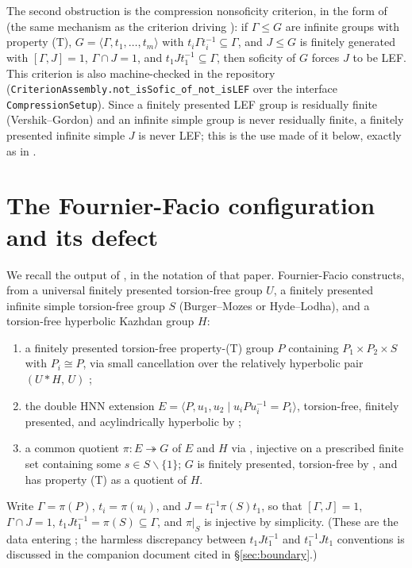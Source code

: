 \documentclass[11pt]{amsart}
\theoremstyle{remark}
\theoremstyle{definition}
\begin{document}
The second obstruction is the compression nonsoficity criterion, in the form
of \cite[Proposition~1.2]{FFF} (the same mechanism as the criterion driving
\cite{OAI,KT}): if $\Gamma\leq G$ are infinite groups with property
\textup{(T)}, $G=\langle\Gamma,t_1,\dots,t_m\rangle$ with
$t_i\Gamma t_i^{-1}\subseteq\Gamma$, and $J\leq G$ is finitely generated with
$[\Gamma,J]=1$, $\Gamma\cap J=1$, and $t_1Jt_1^{-1}\subseteq\Gamma$, then
soficity of $G$ forces $J$ to be LEF.  This criterion is also machine-checked
in the repository (\texttt{CriterionAssembly.not\_isSofic\_of\_not\_isLEF}
over the interface \texttt{CompressionSetup}).  Since a finitely presented
LEF group is residually finite (Vershik--Gordon) and an infinite simple
group is never residually finite, a finitely presented infinite simple $J$
is never LEF; this is the use made of it below, exactly as in \cite{FFF}.

\section{The Fournier-Facio configuration and its defect}\label{sec:ff}

We recall the output of \cite[\S2]{FFF}, in the notation of that paper.
Fournier-Facio constructs, from a universal finitely presented torsion-free
group $U$, a finitely presented infinite simple torsion-free group $S$
(Burger--Mozes or Hyde--Lodha), and a torsion-free hyperbolic Kazhdan group
$H$:

\begin{enumerate}
\item a finitely presented torsion-free property-\textup{(T)} group $P$
  containing $P_1\times P_2\times S$ with $P_i\cong P$, via small
  cancellation over the relatively hyperbolic pair $(U*H,\,U)$
  \cite[Theorem~2.4]{Osin10};
\item the double HNN extension $E=\langle P,u_1,u_2\mid u_iPu_i^{-1}=P_i\rangle$,
  torsion-free, finitely presented, and acylindrically hyperbolic by
  \cite{MO15};
\item a common quotient $\pi\colon E\twoheadrightarrow G$ of $E$ and $H$ via
  \cite[Corollary~7.4]{Hull16}, injective on a prescribed finite set
  containing some $s\in S\smallsetminus\{1\}$; $G$ is finitely presented,
  torsion-free by \cite[Theorem~7.1(e)]{Hull16}, and has property
  \textup{(T)} as a quotient of $H$.
\end{enumerate}

Write $\Gamma=\pi(P)$, $t_i=\pi(u_i)$, and $J=t_1^{-1}\pi(S)t_1$, so that
$[\Gamma,J]=1$, $\Gamma\cap J=1$, $t_1Jt_1^{-1}=\pi(S)\subseteq\Gamma$, and
$\pi|_S$ is injective by simplicity.  (These are the data entering
\cite[Proposition~1.2]{FFF}; the harmless discrepancy between
$t_1J t_1^{-1}$ and $t_1^{-1}Jt_1$ conventions is discussed in the companion
document cited in \S\ref{sec:boundary}.)
\end{document}

